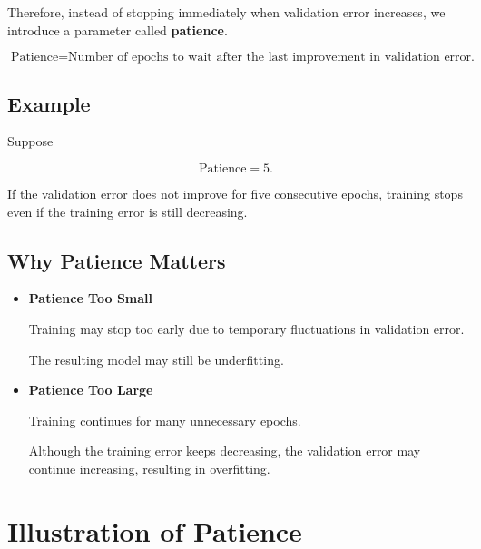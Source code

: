 \documentclass[11pt]{article}
\begin{document}
Therefore, instead of stopping immediately when validation error increases,
we introduce a parameter called \textbf{patience}.

\[
\boxed{
	\text{Patience}=
	\text{Number of epochs to wait after the last improvement in validation error.}
}
\]


\subsection{Example}

Suppose

\[
\text{Patience}=5.
\]

If the validation error does not improve for five consecutive epochs,
training stops even if the training error is still decreasing.


\subsection{Why Patience Matters}

\begin{itemize}
	
	\item \textbf{Patience Too Small}
	
	Training may stop too early due to temporary fluctuations in validation
	error.
	
	The resulting model may still be underfitting.
	
	\vspace{0.3cm}
	
	\item \textbf{Patience Too Large}
	
	Training continues for many unnecessary epochs.
	
	Although the training error keeps decreasing, the validation error may
	continue increasing, resulting in overfitting.
	
\end{itemize}


\section{Illustration of Patience}
\end{document}
